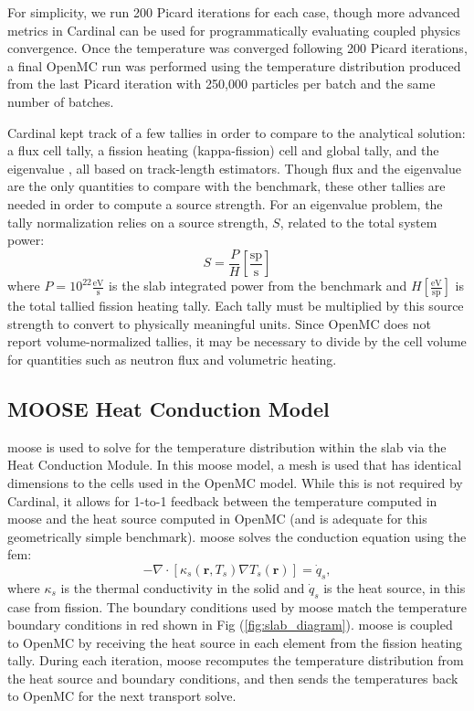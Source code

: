 \documentclass[letterpaper]{mc2023}
\begin{document}
For simplicity, we run 200 Picard iterations for each case, though more advanced metrics in Cardinal can be used for programmatically
evaluating coupled physics convergence. Once the temperature was converged following 200 Picard iterations, a final OpenMC run was
performed using the temperature distribution produced from the last Picard iteration with 250,000 particles per batch and the same
number of batches.

Cardinal kept track of a few tallies in order to compare to the analytical solution: a flux cell tally, a fission heating (kappa-fission)
cell and global tally, and the eigenvalue \keff, all based on track-length estimators. Though flux and the eigenvalue are the only quantities
to compare with the benchmark, these other tallies are needed in order to compute a source strength. For an eigenvalue problem, the tally
normalization relies on a source strength, $S$, related to the total system power:
\begin{equation} \label{eq:source_strength}
   S = \frac{P}{H} \left[\frac{\textrm{sp}}{\textrm{s}} \right]
\end{equation}
where $P=10^{22} \frac{\textrm{eV}}{\textrm{s}}$ is the slab integrated power from the benchmark and $H \left[\frac{\textrm{eV}}{\textrm{sp}} \right]$
is the total tallied fission heating tally. Each tally must be multiplied by this source strength to convert to physically meaningful units. 
Since OpenMC does not report volume-normalized tallies, it may be necessary to divide by the cell volume for quantities such as neutron flux and
volumetric heating.

\subsection{MOOSE Heat Conduction Model}
\gls{moose} is used to solve for the temperature distribution within the slab via the Heat Conduction Module. In this \gls{moose}
model, a mesh is used that has identical dimensions to the cells used in the OpenMC model. While this is not required by Cardinal,
it allows for 1-to-1 feedback between the temperature computed in \gls{moose} and the heat source computed in OpenMC (and is
adequate for this geometrically simple benchmark). \gls{moose} solves the conduction equation using the \gls{fem}:
\begin{equation}\label{eq:conduction}
    - \nabla \cdot [\kappa_{s}(\mathbf{r},T_{s}) \nabla T_{s}(\mathbf{r})] = \dot{q}_{s},
\end{equation}
where $\kappa_{s}$ is the thermal conductivity in the solid and $\dot{q}_{s}$ is the heat source, in this case from fission. The
boundary conditions used by \gls{moose} match the temperature boundary conditions in red shown in Fig (\ref{fig:slab_diagram}).
\gls{moose} is coupled to OpenMC by receiving the heat source in each element from the fission heating tally. During each iteration,
\gls{moose} recomputes the temperature distribution from the heat source and boundary conditions, and then sends the temperatures
back to OpenMC for the next transport solve.
\end{document}
